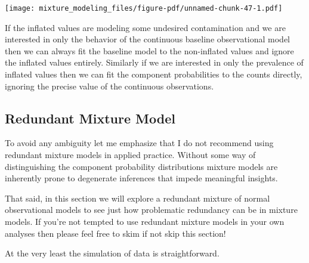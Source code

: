 \documentclass[
  letterpaper,
  DIV=11,
  numbers=noendperiod]{scrartcl}
\begin{document}
\texttt{[image: mixture\_modeling\_files/figure-pdf/unnamed-chunk-47-1.pdf]}

If the inflated values are modeling some undesired contamination and we
are interested in only the behavior of the continuous baseline
observational model then we can always fit the baseline model to the
non-inflated values and ignore the inflated values entirely. Similarly
if we are interested in only the prevalence of inflated values then we
can fit the component probabilities to the counts directly, ignoring the
precise value of the continuous observations.

\subsection{Redundant Mixture Model}\label{redundant-mixture-model}

To avoid any ambiguity let me emphasize that I do not recommend using
redundant mixture models in applied practice. Without some way of
distinguishing the component probability distributions mixture models
are inherently prone to degenerate inferences that impede meaningful
insights.

That said, in this section we will explore a redundant mixture of normal
observational models to see just how problematic redundancy can be in
mixture models. If you're not tempted to use redundant mixture models in
your own analyses then please feel free to skim if not skip this
section!

At the very least the simulation of data is straightforward.
\end{document}
